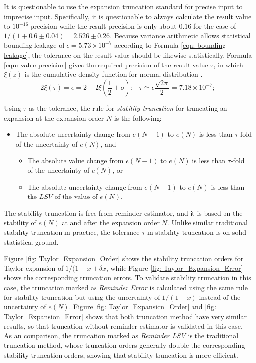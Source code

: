 \documentclass[twoside]{article}
\numberwithin{equation}{section}
\newcommand{\eqspace}{\;\;\;}
\begin{document}
It is questionable to use the expansion truncation standard for precise input to imprecise input.
Specifically, it is questionable to always calculate the result value to $10^{-16}$ precision while the result precision is only about $0.16$ for the case of $1/(1 + 0.6 \pm 0.04)=2.526 \pm 0.26$.
Because variance arithmetic allows statistical bounding leakage of $\epsilon = 5.73 \times 10^{-7}$ according to Formula \eqref{eqn: bounding leakage}, the tolerance on the result value should be likewise statistically.
Formula \eqref{eqn: value precision} gives the required precision of the result value $\tau$, in which $\xi(z)$ is the cumulative density function for normal distribution \cite{Probability_Statistics}.
\begin{equation}
\label{eqn: value precision}
2 \xi(\tau) = \epsilon = 2 - 2 \xi(\frac{1}{2} + \sigma):\eqspace \tau \simeq \epsilon \frac{\sqrt{2 \pi}}{2} = 7.18\times 10^{-7};
\end{equation}

Using $\tau$ as the tolerance, the rule for \emph{stability truncation} for truncating an expansion at the expansion order $N$ is the following:
\begin{itemize}
\item The absolute uncertainty change from $e(N-1)$ to $e(N)$ is less than $\tau$-fold of the uncertainty of $e(N)$, and

	\begin{itemize}
	\item The absolute value change from $e(N-1)$ to $e(N)$ is less than $\tau$-fold of the uncertainty of $e(N)$, or
	
	\item The absolute uncertainty change from $e(N-1)$ to $e(N)$ is less than the $LSV$ of the value of $e(N)$.
	\end{itemize}
\end{itemize}
The stability truncation is free from reminder estimator, and it is based on the stability of $e(N)$ at and after the expansion order $N$.
Unlike similar traditional stability truncation in practice, the tolerance $\tau$ in stability truncation is on solid statistical ground.

Figure \ref{fig: Taylor_Expansion_Order} shows the stability truncation orders for Taylor expansion of $1/(1 - x \pm \delta x$, while Figure \ref{fig: Taylor_Expansion_Error} shows the corresponding truncation errors.
To validate stability truncation in this case, the truncation marked as \textit{Reminder Error} is calculated using the same rule for stability truncation but using the uncertainty of $1/(1-x)$ instead of the uncertainty of $e(N)$. 
Figure \ref{fig: Taylor_Expansion_Order} and \ref{fig: Taylor_Expansion_Error} shows that both truncation method have very similar results, so that truncation without reminder estimator is validated in this case.
As an comparison, the truncation marked as \textit{Reminder LSV} is the traditional truncation method, whose truncation orders generally double the corresponding stability truncation orders, showing that stability truncation is more efficient.
\end{document}

